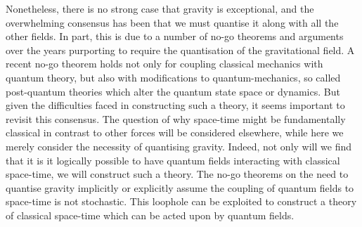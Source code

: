 \documentclass[aps,pra,showpacs,citeautoscript,amsmath,amssymb,floatfix,superscriptaddress,bbm, verbatim,amsfonts,changes,12pt,nofootinbib,longbibliography]{revtex4-2}
\begin{document}
Nonetheless, there is no strong case that gravity is exceptional, and the overwhelming consensus has been that we must quantise it along with all the other fields. In part, this is due to 
a number of no-go theorems and arguments over the years\cite{bohr1933on,cecile2011role,dewitt1962definition,
eppley1977necessity,caro1999impediments,salcedo1996absence,
sahoo2004mixing,terno2006inconsistency,salcedo2012statistical,barcelo2012hybrid,marletto2017we} purporting to require the quantisation of the gravitational field.
A recent no-go theorem\cite{marletto2017we} holds not only for coupling classical mechanics with quantum theory, but also with modifications to quantum-mechanics, so called post-quantum theories which alter the quantum state space or dynamics\cite{dynamics_foot}.
But given the difficulties faced in constructing such a theory, it seems important to revisit this consensus. The question of why space-time might be fundamentally classical in contrast to other forces will be considered elsewhere\cite{oppenheim2023rethink}, while here we merely consider the necessity of quantising gravity. Indeed, not only will we find that it is it logically possible to have quantum fields interacting with classical space-time, we will construct such a theory. The no-go theorems on the need to quantise gravity implicitly or explicitly assume the coupling of quantum fields to space-time is not stochastic. This loophole can be exploited to construct a theory of classical space-time which can be acted upon by quantum fields.
\end{document}

